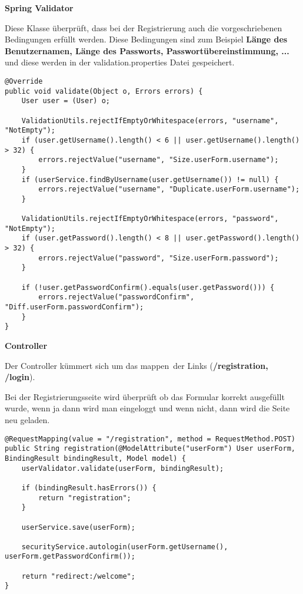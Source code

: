 \item \textbf{Spring Validator}

Diese Klasse überprüft, dass bei der Registrierung auch die vorgeschriebenen Bedingungen erfüllt werden. Diese Bedingungen sind zum Beispiel \textbf{Länge des Benutzernamen, Länge des Passworts, Passwortübereinstimmung, ...} und diese werden in der validation.properties Datei gespeichert.

\begin{lstlisting}[style=Java]
@Override
public void validate(Object o, Errors errors) {
	User user = (User) o;

	ValidationUtils.rejectIfEmptyOrWhitespace(errors, "username", "NotEmpty");
	if (user.getUsername().length() < 6 || user.getUsername().length() > 32) {
		errors.rejectValue("username", "Size.userForm.username");
	}
	if (userService.findByUsername(user.getUsername()) != null) {
		errors.rejectValue("username", "Duplicate.userForm.username");
	}

	ValidationUtils.rejectIfEmptyOrWhitespace(errors, "password", "NotEmpty");
	if (user.getPassword().length() < 8 || user.getPassword().length() > 32) {
		errors.rejectValue("password", "Size.userForm.password");
	}

	if (!user.getPasswordConfirm().equals(user.getPassword())) {
		errors.rejectValue("passwordConfirm", "Diff.userForm.passwordConfirm");
	}
}
\end{lstlisting}

\clearpage

\item \textbf{Controller}

Der Controller kümmert sich um das \glqq mappen\grqq \ der Links (\textbf{/registration, /login}).

Bei der Registrierungsseite wird überprüft ob das Formular korrekt ausgefüllt wurde, wenn ja dann wird man eingeloggt und wenn nicht, dann wird die Seite neu geladen.

\begin{lstlisting}[style=Java]
@RequestMapping(value = "/registration", method = RequestMethod.POST)
public String registration(@ModelAttribute("userForm") User userForm, BindingResult bindingResult, Model model) {
	userValidator.validate(userForm, bindingResult);

	if (bindingResult.hasErrors()) {
		return "registration";
	}

	userService.save(userForm);

	securityService.autologin(userForm.getUsername(), userForm.getPasswordConfirm());

	return "redirect:/welcome";
}
\end{lstlisting}

